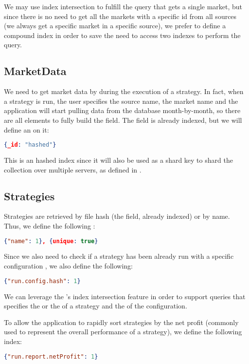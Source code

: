 We may use index intersection to fulfill the query that gets a single market,
but since there is no need to get all the markets with a specific id from all
sources (we always get a specific market in a specific source), we prefer to
define a compound index in order to save \mongodb{} the need to access two indexes
to perform the query.

\subsection{MarketData}

We need to get market data by  during the execution of a strategy. In
fact, when a strategy is run, the user specifies the source name, the market
name and the application will start pulling data from the database
month-by-month, so there are all elements to fully build the  field.
The  field is already indexed, but we will define an  on it:

\begin{lstlisting}[language=json]
{_id: "hashed"}
\end{lstlisting}

This is an hashed index since it will also be used as a shard key to shard the
collection over multiple servers, as defined in .

\subsection{Strategies}

Strategies are retrieved by file hash (the  field, already indexed)
or by name. Thus, we define the following :

\begin{lstlisting}[language=json]
{"name": 1}, {unique: true}
\end{lstlisting}

Since we also need to check if a strategy has been already run with a specific
configuration , we also define the
following:

\begin{lstlisting}[language=json]
{"run.config.hash": 1}
\end{lstlisting}

We can leverage the \mongodb's index intersection feature in order to support
queries that specifies the  or the  of a strategy and the
 of the configuration.

To allow the application to rapidly sort strategies by the net profit (commonly
used to represent the overall performance of a strategy), we define the
following index:

\begin{lstlisting}[language=json]
{"run.report.netProfit": 1}
\end{lstlisting}
